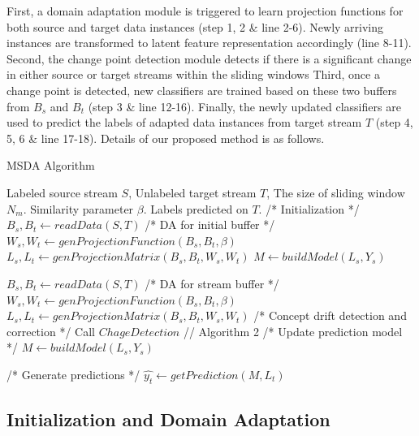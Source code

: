 First, a domain adaptation module is triggered to learn projection functions for both source and target data instances (step 1, 2 \& line 2-6). 
Newly arriving instances are transformed to latent feature representation accordingly (line 8-11). 
Second, the change point detection module detects if there is a significant change in either source or target streams within the sliding windows  
Third, once a change point is detected, new classifiers are trained based on these two buffers from $B_s$ and $B_t$ (step 3 \& line 12-16).
Finally, the newly updated classifiers are used to  predict the labels of adapted data instances from target stream $T$ (step 4, 5, 6 \& line 17-18). Details of our proposed method is as follows.

\begin{algorithm}[t]  
\caption{MSDA Algorithm}  
\label{alg::overall}  
\begin{algorithmic}[1]  
\Require  
Labeled source stream $S$,
Unlabeled target stream $T$,  
The size of sliding window $N_m$.
Similarity parameter $\beta$.
\Ensure  
Labels predicted on $T$.
\State /* Initialization */
\State $B_s, B_t \gets readData(S,T)$
\State /* DA for initial buffer */
\State $W_s, W_t \gets genProjectionFunction(B_s, B_t, \beta)$
\State $L_s, L_t \gets genProjectionMatrix(B_s, B_t, W_s, W_t)$
\State $M \gets buildModel(L_s, Y_s)$

\State $B_s, B_t \gets readData(S,T)$
\State /* DA for stream buffer */
\State $W_s, W_t \gets genProjectionFunction(B_s, B_t, \beta)$
\State $L_s, L_t \gets genProjectionMatrix(B_s, B_t, W_s, W_t)$
\State /* Concept drift detection and correction */
\State Call $ChageDetection$ // Algorithm 2
\State /* Update prediction model */
\State $M \gets buildModel(L_s, Y_s)$

\EndIf
\State /* Generate predictions */
\State $\hat{y_{t}} \gets getPrediction(M,L_t)$
\EndWhile

\end{algorithmic}  
\end{algorithm}

\subsection{Initialization and Domain Adaptation}


